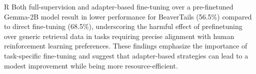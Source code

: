R Both full-supervision and adapter-based fine-tuning over a pre-finetuned Gemma-2B model result in lower performance for BeaverTails (56.5\%) compared to direct fine-tuning (68.5\%), underscoring the harmful effect of prefinetuning over generic retrieval data in tasks requiring precise alignment with human reinforcement learning preferences. These findings emphasize the importance of task-specific fine-tuning and suggest that adapter-based strategies can lead to a modest improvement while being more resource-efficient.

